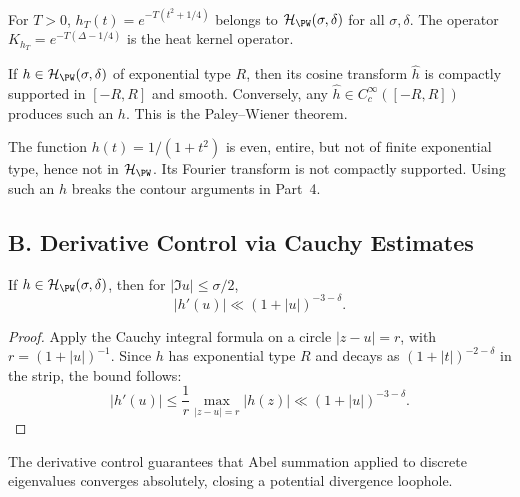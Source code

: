 \begin{example}
\label{ex:gaussian-probe}
For $T>0$, $h_T(t)=e^{-T(t^2+1/4)}$ belongs to $\mathcal H_{\PW}(\sigma,\delta)$ for all $\sigma,\delta$. The operator $K_{h_T}=e^{-T(\Delta-1/4)}$ is the heat kernel operator.
\end{example}

\begin{remark}
If $h\in \mathcal H_{\PW}(\sigma,\delta)$ of exponential type $R$, then its cosine transform $\hat h$ is compactly supported in $[-R,R]$ and smooth. Conversely, any $\hat h\in C_c^\infty([-R,R])$ produces such an $h$. This is the Paley–Wiener theorem.
\end{remark}

\begin{counterexample}
The function $h(t)=1/(1+t^2)$ is even, entire, but not of finite exponential type, hence not in $\mathcal H_{\PW}$. Its Fourier transform is not compactly supported. Using such an $h$ breaks the contour arguments in Part~4.
\end{counterexample}


\subsection*{B. Derivative Control via Cauchy Estimates}
\label{subsec:cauchy-derivative-part2}

\begin{lemma}
\label{lem:cauchy-deriv-part2}
If $h\in \mathcal H_{\PW}(\sigma,\delta)$, then for $|\Im u|\le \sigma/2$,
\[
  |h'(u)|\ll (1+|u|)^{-3-\delta}.
\]
\end{lemma}

\begin{proof}
Apply the Cauchy integral formula on a circle $|z-u|=r$, with $r=(1+|u|)^{-1}$. Since $h$ has exponential type $R$ and decays as $(1+|t|)^{-2-\delta}$ in the strip, the bound follows:
\[
  |h'(u)| \le \frac{1}{r}\max_{|z-u|=r}|h(z)| \ll (1+|u|)^{-3-\delta}.
\]
\end{proof}

\begin{remark}
The derivative control guarantees that Abel summation applied to discrete eigenvalues converges absolutely, closing a potential divergence loophole.
\end{remark}

